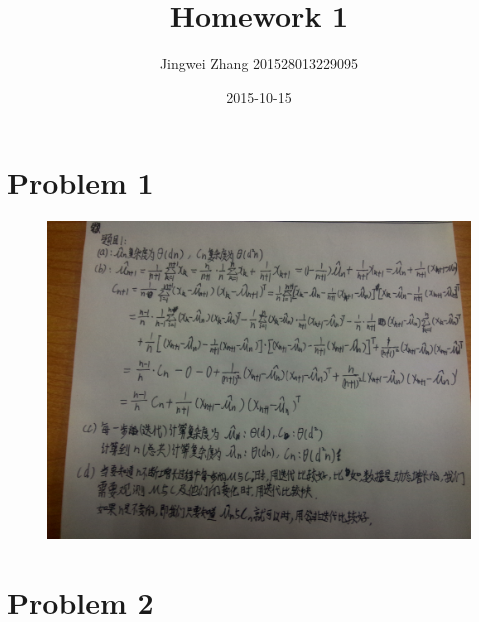 \documentclass[]{article}
\title{Homework 1}
\date{2015-10-15}
\author{Jingwei Zhang 201528013229095}
\begin{document}
    \maketitle
    \section{Problem 1}
    \begin{figure}[H]
        \centering
        \includegraphics[scale=0.15]{P1.jpg}
    \end{figure}
    \section{Problem 2}
\end{document}
